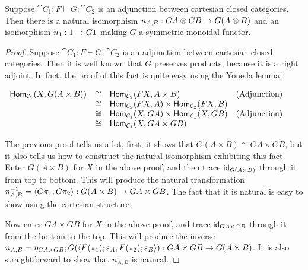 \begin{lemma}
  \label{lemma:right-adjoints_are_strong_symmetric_monoidal_functors}
  Suppose $\cat{C}_1 : F \vdash G : \cat{C}_2$ is an adjunction
  between cartesian closed categories.  Then there is a natural
  isomorphism $n_{A,B} : GA \otimes GB \rightarrow G(A \otimes B)$ and an
  isomorphism $n_1 : 1 \rightarrow G1$ making $G$ a symmetric monoidal
  functor.  
\end{lemma}
\begin{proof}
  Suppose $\cat{C}_1 : F \vdash G : \cat{C}_2$ is an adjunction
  between cartesian closed categories.  Then it is well known that $G$
  preserves products, because it is a right adjoint.  In fact, the
  proof of this fact is quite easy using the Yoneda lemma:
  \begin{center}
    \begin{math}
      \begin{array}{lllllll}
        \mathsf{Hom}_{\mathcal{C}_1}(X,G(A \times B))
        & \cong & \mathsf{Hom}_{\mathcal{C}_2}(FX,A \times B) & \text{(Adjunction)}\\
        & \cong & \mathsf{Hom}_{\mathcal{C}_2}(FX,A) \times \mathsf{Hom}_{\mathcal{C}_2}(FX,B) & \\
        & \cong & \mathsf{Hom}_{\mathcal{C}_1}(X,GA) \times \mathsf{Hom}_{\mathcal{C}_1}(X,GB) & \text{(Adjunction)}\\
        & \cong & \mathsf{Hom}_{\mathcal{C}_1}(X,GA \times GB) 
      \end{array}
    \end{math}
  \end{center}
  The previous proof tells us a lot, first, it shows that $G(A \times
  B) \cong GA \times GB$, but it also tells us how to construct the
  natural isomorphism exhibiting this fact.  Enter $G(A \times B)$ for
  $X$ in the above proof, and then trace $\mathsf{id}_{G(A \times B)}$ through
  it from top to bottom.  This will produce the natural transformation
  $n^{-1}_{A,B} = \langle G\pi_1, G\pi_2\rangle : G(A \times B) \rightarrow GA
  \times GB$.  The fact that it is natural is easy to show using the
  cartesian structure.

  Now enter $GA \times GB$ for $X$ in the above proof, and trace
  $\mathsf{id}_{GA \times GB}$ through it from the bottom to the top.  This
  will produce the inverse \\
  $n_{A,B} = \eta_{GA \times GB};G(\langle F(\pi_1);\varepsilon_A, F(\pi_2);\varepsilon_B \rangle) : GA \times GB \rightarrow G(A \times B)$.
  It is also straightforward to show that $n_{A,B}$ is natural.


\end{proof}
